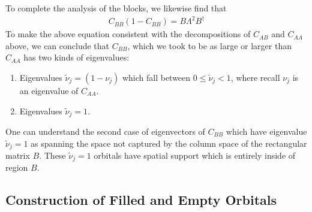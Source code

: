 \documentclass[aps, superscriptaddress, floatfix, onecolumn]{revtex4-2}
\begin{document}
To complete the analysis of the blocks, we likewise find that
\begin{align}
C_{BB} (1-C_{BB}) = B \Lambda^2 B^\dagger
\end{align}
To make the above equation consistent with the decompositions of $C_{AB}$ and $C_{AA}$ above, we can conclude that $C_{BB}$, which we took to
be as large or larger than $C_{AA}$ has two kinds of eigenvalues:
\begin{enumerate}
\item Eigenvalues $\tilde{\nu}_j = (1-\nu_j)$ which fall between $0 \leq \tilde{\nu}_j < 1$, where recall $\nu_j$ is an eigenvalue of $C_{AA}$.
\item Eigenvalues $\tilde{\nu}_j = 1$.
\end{enumerate}
One can understand the second case of eigenvectors of $C_{BB}$ which have eigenvalue $\tilde{\nu}_j = 1$ as spanning the space not captured by 
the column space of the rectangular matrix $B$.
These $\tilde{\nu}_j = 1$ orbitals have spatial support which is entirely inside of region $B$.

\subsection{Construction of Filled and Empty Orbitals}
\end{document}
